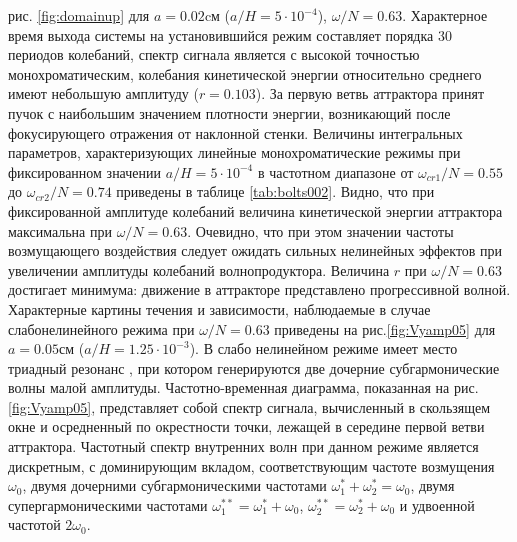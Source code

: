 рис. \ref{fig:domainup}
для  $a=0.02$cм ($a/H=5\cdot 10^{-4}$), $\omega/N=0.63$. Характерное время выхода системы на установившийся режим составляет порядка $30$ периодов колебаний, спектр сигнала является с высокой точностью монохроматическим, колебания кинетической энергии относительно среднего имеют небольшую амплитуду ($r=0.103$). За первую ветвь аттрактора принят пучок с наибольшим значением плотности энергии, возникающий после фокусирующего отражения от наклонной стенки. Величины интегральных параметров, характеризующих линейные монохроматические режимы при фиксированном значении $a/H=5\cdot 10^{-4}$ в частотном диапазоне от $\omega_{cr1}/N=0.55$ до $\omega_{cr2}/N=0.74$ приведены в таблице \ref{tab:bolts002}. Видно, что при фиксированной амплитуде колебаний величина кинетической энергии аттрактора максимальна при $\omega/N=0.63$. Очевидно, что при этом значении частоты возмущающего воздействия следует ожидать сильных нелинейных эффектов при увеличении амплитуды колебаний волнопродуктора. Величина $r$ при $\omega/N=0.63$ достигает минимума: движение в аттракторе представлено прогрессивной волной.  Характерные картины течения и зависимости, наблюдаемые в случае слабонелинейного режима при $\omega/N=0.63$ приведены на рис.\ref{fig:Vyamp05} для $a=0.05$см ($a/H=1.25\cdot 10^{-3}$). В слабо нелинейном режиме имеет место триадный резонанс \cite{Dauxoisetal2018}, при котором генерируются две дочерние субгармонические волны малой амплитуды.  Частотно-временная диаграмма, показанная на рис. \ref{fig:Vyamp05}, представляет собой спектр сигнала, вычисленный в скользящем окне и осредненный по окрестности точки, лежащей в середине первой ветви аттрактора. Частотный спектр внутренних волн при данном режиме является дискретным, с доминирующим вкладом, соответствующим частоте возмущения $\omega_{0}$, двумя дочерними субгармоническими частотами $\omega_{1}^{*}+\omega_{2}^{*}=\omega_{0}$, двумя супергармоническими частотами $\omega_{1}^{**}=\omega_{1}^{*}+\omega_{0}$, $\omega_{2}^{**}=\omega_{2}^{*}+\omega_{0}$ и удвоенной частотой $2\omega_{0}$. 


